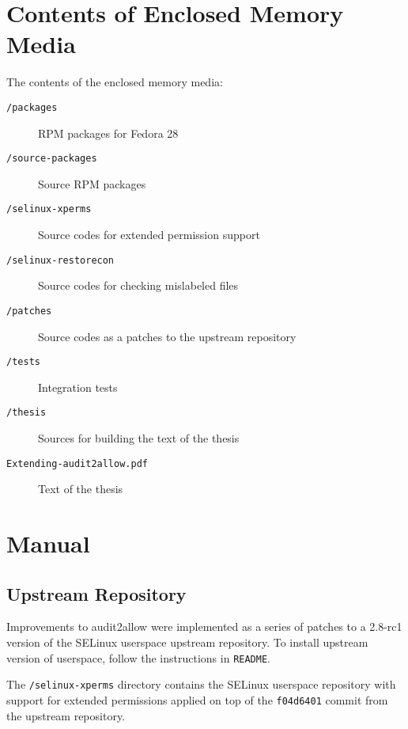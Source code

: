 
\chapter{Contents of Enclosed Memory Media}

The contents of the enclosed memory media:
\begin{description}
    \item [\texttt{/packages}] RPM packages for Fedora 28
    \item [\texttt{/source-packages}] Source RPM packages
    \item [\texttt{/selinux-xperms}] Source codes for extended permission support
    \item [\texttt{/selinux-restorecon}] Source codes for checking mislabeled
        files
    \item [\texttt{/patches}] Source codes as a patches to the upstream
        repository
    \item [\texttt{/tests}] Integration tests
    \item [\texttt{/thesis}] Sources for building the text of the thesis
    \item [\texttt{Extending-audit2allow.pdf}] Text of the thesis
\end{description}

\chapter{Manual}

\section{Upstream Repository}

Improvements to audit2allow were implemented as a series of patches to a 2.8-rc1
version of the SELinux userspace upstream repository. To install upstream
version of userspace, follow the instructions in \texttt{README}.

The \texttt{/selinux-xperms} directory contains the SELinux userspace repository
with support for extended permissions applied on top of the \texttt{f04d6401}
commit from the upstream repository.

